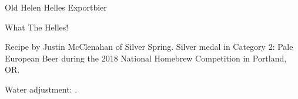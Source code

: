 \begin{recipe}{Old Helen Helles Exportbier}
\begin{recipe}{What The Helles!}
\begin{aboutblock}
Recipe by Justin McClenahan of Silver Spring. Silver medal in Category 2: Pale
European Beer during the 2018 National Homebrew Competition in Portland, OR.
\sourceaha
\end{aboutblock}


\begin{methodandtiming}

\begin{mashsteps}
\end{mashsteps}

\begin{fermentationsteps}
\end{fermentationsteps}

\begin{directions}
Water adjustment: .
\end{directions}

\end{methodandtiming}

\recipebreak

\begin{ingredientsblock}

\begin{malts}
\end{malts}

\begin{hops}
\end{hops}


\end{ingredientsblock}

\end{recipe}

\end{recipe}
